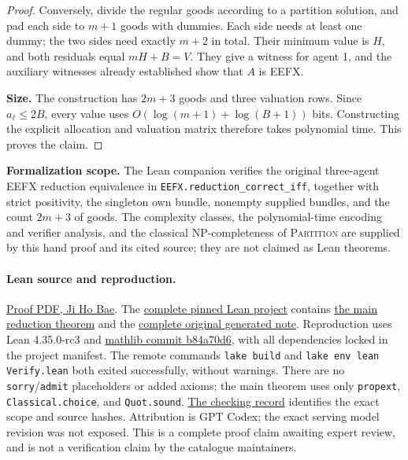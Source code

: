 \documentclass[11pt]{article}
\begin{document}
\begin{proof}
Conversely, divide the regular goods according to a partition solution,
and pad each side to $m+1$ goods with dummies. Each side needs at least
one dummy; the two sides need exactly $m+2$ in total. Their minimum
value is $H$, and both residuals equal $mH+B=V$. They give a witness
for agent 1, and the auxiliary witnesses already established show that
$A$ is EEFX.

\textbf{Size.}
The construction has $2m+3$ goods and three valuation rows.
Since $a_\ell\leq2B$, every value uses
$O(\log(m+1)+\log(B+1))$ bits. Constructing the explicit allocation and
valuation matrix therefore takes polynomial time. This proves the claim.
\end{proof}

\textbf{Formalization scope.}
The Lean companion verifies the original three-agent EEFX reduction
equivalence in \texttt{EEFX.reduction\_correct\_iff}, together with
strict positivity, the singleton own bundle, nonempty supplied bundles,
and the count $2m+3$ of goods. The complexity classes, the polynomial-time
encoding and verifier analysis, and the classical NP-completeness of
\textsc{Partition} are supplied by this hand proof and its cited source;
they are not claimed as Lean theorems.
\paragraph{Lean source and reproduction.}
\href{https://github.com/jbaelaw/eefx-recognition-lean/blob/4fa24ef0066295da70ef23370c9aedf87bd3114a/paper/ShortProof.pdf}{Proof PDF, Ji Ho Bae}.
The \href{https://github.com/jbaelaw/eefx-recognition-lean/tree/4fa24ef0066295da70ef23370c9aedf87bd3114a}{complete pinned Lean project}
contains \href{https://github.com/jbaelaw/eefx-recognition-lean/blob/4fa24ef0066295da70ef23370c9aedf87bd3114a/EEFX/Reduction.lean}{the main reduction theorem}
and the \href{https://github.com/jbaelaw/eefx-recognition-lean/blob/4fa24ef0066295da70ef23370c9aedf87bd3114a/original/initial-research-note.tex}{complete original generated note}.
Reproduction uses Lean 4.35.0-rc3 and
\href{https://github.com/leanprover-community/mathlib4/tree/b84a70d6a5ed793cc46184160f4d4188d8c825fb}{mathlib commit b84a70d6},
with all dependencies locked in the project manifest.
The remote commands \texttt{lake build} and \texttt{lake env lean Verify.lean}
both exited successfully, without warnings. There are no
\texttt{sorry}/\texttt{admit} placeholders or added axioms;
the main theorem uses only \texttt{propext}, \texttt{Classical.choice},
and \texttt{Quot.sound}.
\href{https://github.com/jbaelaw/eefx-recognition-lean/blob/4fa24ef0066295da70ef23370c9aedf87bd3114a/verification/LeanVerification.json}{The checking record}
identifies the exact scope and source hashes. Attribution is GPT Codex;
the exact serving model revision was not exposed. This is a complete
proof claim awaiting expert review, and is not a verification claim
by the catalogue maintainers.
\end{document}
